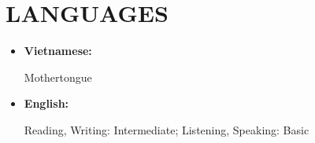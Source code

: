 \section{LANGUAGES}
\vspace{1mm}
\begin{itemize}[leftmargin=*]
    \item \textbf{\small Vietnamese: }\raggedright Mothertongue
    \item \textbf{\small English: }\raggedright Reading, Writing: Intermediate; Listening, Speaking: Basic
\end{itemize}